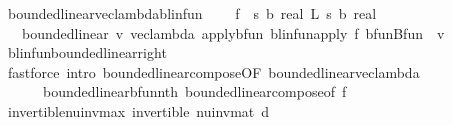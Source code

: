 \begin{isabellebody}
\endisatagproof
{\isafoldproof}%
%
\isadelimproof
\isanewline
%
\endisadelimproof
\isanewline
\isanewline
{}\isamarkupfalse%
\ bounded{\isacharunderscore}{\kern0pt}linear{\isacharunderscore}{\kern0pt}vec{\isacharunderscore}{\kern0pt}lambda{\isacharunderscore}{\kern0pt}blinfun{\isacharcolon}{\kern0pt}\ \isanewline
\ \ \ f\ {\isacharcolon}{\kern0pt}{\isacharcolon}{\kern0pt}\ {\isachardoublequoteopen}{\isacharparenleft}{\kern0pt}{\isacharprime}{\kern0pt}s\ {\isasymRightarrow}\isactrlsub b\ real{\isacharparenright}{\kern0pt}\ {\isasymRightarrow}\isactrlsub L\ {\isacharparenleft}{\kern0pt}{\isacharprime}{\kern0pt}s\ {\isasymRightarrow}\isactrlsub b\ real{\isacharparenright}{\kern0pt}{\isachardoublequoteclose}\isanewline
\ \ \ {\isachardoublequoteopen}bounded{\isacharunderscore}{\kern0pt}linear\ {\isacharparenleft}{\kern0pt}{\isasymlambda}v{\isachardot}{\kern0pt}\ vec{\isacharunderscore}{\kern0pt}lambda\ {\isacharparenleft}{\kern0pt}apply{\isacharunderscore}{\kern0pt}bfun\ {\isacharparenleft}{\kern0pt}blinfun{\isacharunderscore}{\kern0pt}apply\ f\ {\isacharparenleft}{\kern0pt}bfun{\isachardot}{\kern0pt}Bfun\ {\isacharparenleft}{\kern0pt}{\isacharparenleft}{\kern0pt}{\isachardollar}{\kern0pt}{\isacharparenright}{\kern0pt}\ v{\isacharparenright}{\kern0pt}{\isacharparenright}{\kern0pt}{\isacharparenright}{\kern0pt}{\isacharparenright}{\kern0pt}{\isacharparenright}{\kern0pt}{\isachardoublequoteclose}\ \isanewline
%
\isadelimproof
\ \ %
\endisadelimproof
%
\isatagproof
{}\isamarkupfalse%
\ blinfun{\isachardot}{\kern0pt}bounded{\isacharunderscore}{\kern0pt}linear{\isacharunderscore}{\kern0pt}right\isanewline
\ \ \isamarkupfalse%
\ {\isacharparenleft}{\kern0pt}fastforce\ intro{\isacharcolon}{\kern0pt}\ bounded{\isacharunderscore}{\kern0pt}linear{\isacharunderscore}{\kern0pt}compose{\isacharbrackleft}{\kern0pt}OF\ bounded{\isacharunderscore}{\kern0pt}linear{\isacharunderscore}{\kern0pt}vec{\isacharunderscore}{\kern0pt}lambda{\isacharbrackright}{\kern0pt}\ \isanewline
\ \ \ \ \ \ bounded{\isacharunderscore}{\kern0pt}linear{\isacharunderscore}{\kern0pt}bfun{\isacharunderscore}{\kern0pt}nth\ bounded{\isacharunderscore}{\kern0pt}linear{\isacharunderscore}{\kern0pt}compose{\isacharbrackleft}{\kern0pt}of\ f{\isacharbrackright}{\kern0pt}{\isacharparenright}{\kern0pt}%
\endisatagproof
{\isafoldproof}%
%
\isadelimproof
\isanewline
%
\endisadelimproof
\isanewline
{}\isamarkupfalse%
\ invertible{\isacharunderscore}{\kern0pt}nu{\isacharunderscore}{\kern0pt}inv{\isacharunderscore}{\kern0pt}max{\isacharcolon}{\kern0pt}\ {\isachardoublequoteopen}invertible\ {\isacharparenleft}{\kern0pt}nu{\isacharunderscore}{\kern0pt}inv{\isacharunderscore}{\kern0pt}mat\ d{\isacharparenright}{\kern0pt}{\isachardoublequoteclose}\isanewline

\end{isabellebody}
